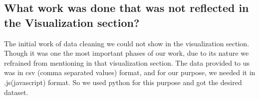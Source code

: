 \subsection{What work was done that was not reflected in the Visualization section?}
The initial work of data cleaning we could not show in the visualization section. Though it was one the most important phases of our work, due to its nature we refrained from mentioning in that visualization section. The data provided to us was in csv (comma separated values) format, and for our purpose, we needed it in .js(javascript) format. So we used python for this purpose and got the desired dataset.


